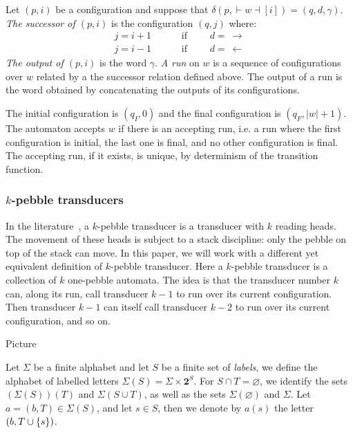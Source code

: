 Let $(p,i)$ be a configuration and suppose that $\delta(p, {\vdash} w{\dashv}[i])=(q,d,\gamma)$. \emph{The successor of $(p,i)$} is the configuration $(q,j)$
where:
\begin{align*}
 j=i+1 &\qquad \text{ if }\qquad d=\ \rightarrow\\
 j=i-1 &\qquad \text{ if }\qquad d=\ \leftarrow 
\end{align*}
\emph{The output of $(p,i)$} is the word $\gamma$. \emph{A run} on $w$ is a sequence of configurations over $w$ related by a the successor relation defined above. The output of a run is the word obtained by concatenating the outputs of its configurations.


The initial configuration is $(q_I, 0)$ and the final configuration is $(q_F,|w|+1)$. The automaton accepts $w$ if there is an accepting run,
i.e. a run where the first configuration is initial, the last one is final, and no other configuration is final. The accepting run, if it exists, is unique, by determinism of the transition function.


\subsubsection{$k$-pebble transducers}

In the literature~\cite{}, a $k$-pebble transducer is a transducer with $k$ reading heads. The movement of these heads is subject to a stack discipline: only the pebble on top of the stack can move.
In this paper, we will work with a different yet equivalent definition of $k$-pebble transducer. Here a $k$-pebble transducer is a collection of $k$ one-pebble automata. The idea is that the transducer number $k$ can, along its run, call transducer $k-1$ to run over its current configuration. Then transducer $k-1$ can itself call transducer $k-2$ to run over its current configuration, and so on.
\begin{center}
Picture
\end{center}
Let $\Sigma$ be a finite alphabet and let $S$ be a finite set of \emph{labels}, we define the alphabet of labelled letters $\Sigma(S)=\Sigma\times \mathbf 2^S$. For $S\cap T=\varnothing$, we identify the sets $(\Sigma(S))(T)$ and $\Sigma(S\cup T)$, as well as the sets $\Sigma(\varnothing)$ and $\Sigma$.
Let $a=(b,T)\in \Sigma(S)$, and let $s\in S$, then we denote by  $a(s)$ the letter $(b,T\cup\{s\})$.

